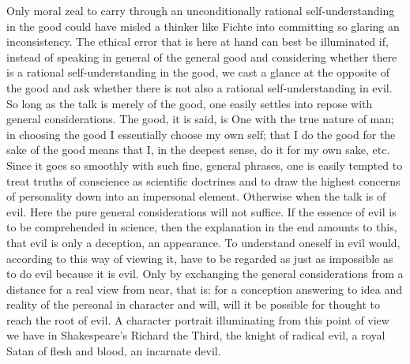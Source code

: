 \documentclass[12pt,a4paper,openany]{book}
\newcommand{\opage}[1]{\marginnote{\footnotesize\textit{[#1]}}}
\begin{document}
Only moral zeal to carry through an unconditionally
rational self-understanding in the good could have misled
a thinker like Fichte into committing so glaring
an inconsistency. The ethical error that is here at hand
can best be illuminated if, instead of speaking in general
of the general good and considering whether there
is a rational self-understanding in the good, we cast a glance at
the opposite of the good and ask whether there is not also
a rational self-understanding in evil. So long as the talk
is merely of the good, one easily settles into repose with general
considerations. The good, it is said, is One
with the true nature of man; in choosing the good
I essentially choose my own self; that I do the good
for the sake of the good means that I, in the deepest sense,
do it for my own sake, etc. Since it goes so
smoothly with such fine, general phrases, one
is easily tempted to treat truths of conscience
as scientific doctrines and to draw the highest
concerns of personality down into an impersonal
element. Otherwise when the talk is of evil. Here
the pure general considerations will not suffice. If
the essence of evil is to be comprehended in science, then the explanation
in the end amounts to this, that evil is only a deception,
an appearance. To understand oneself in evil would,
according to this way of viewing it, have to be regarded as just as impossible
as to do evil because it is evil. Only by
exchanging the general considerations from a distance for a real
view from near, that is: for a conception answering to idea and reality
of the personal in character
\setcounter{footnote}{0}%
\opage{530}and will, will it be possible for thought to reach the root
of evil. A character portrait illuminating from this point of view
we have in Shakespeare's Richard the Third,
the knight of radical evil, a royal Satan of
flesh and blood, an incarnate devil.
\end{document}
